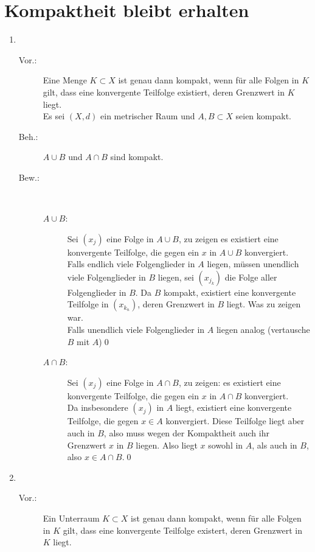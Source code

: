\documentclass[sectionformat=aufgabe]{gadsescript}
\begin{document}
\section{Kompaktheit bleibt erhalten}
\begin{enumerate}[label=(\alph*)]
	\item ~
		\begin{description}
			\item[Vor.:] Eine Menge $ K \subset X $ ist genau dann kompakt, wenn für alle Folgen in $ K $ gilt, dass eine konvergente Teilfolge existiert, deren Grenzwert in $ K $ liegt.\\
				Es sei $ (X, d) $ ein metrischer Raum und $ A, B \subset X $ seien kompakt.
			\item[Beh.:] $ A \cup B $ und $ A \cap B $ sind kompakt.
			\item[Bew.:] ~
				\begin{description}
					\item[$ A \cup B $:] Sei $ (x_j) $ eine Folge in $ A \cup B $, zu zeigen es existiert eine konvergente Teilfolge, die gegen ein $ x $ in $ A \cup B $ konvergiert.\\
						Falls endlich viele Folgenglieder in $ A $ liegen, müssen unendlich viele Folgenglieder in $ B $ liegen, sei $ (x_{j_k} ) $ die Folge aller Folgenglieder in $ B $.
						Da $ B $ kompakt, existiert eine konvergente Teilfolge in $ (x_{k_n} ) $, deren Grenzwert in $ B $ liegt. Was zu zeigen war.\\
						Falls unendlich viele Folgenglieder in $ A $ liegen analog (vertausche $ B $ mit $ A $)\qed
					\item[$ A \cap B $:] Sei $ (x_j) $ eine Folge in $ A \cap B $, zu zeigen: es existiert eine konvergente Teilfolge, die gegen ein $ x $ in $ A \cap B $ konvergiert.\\
						Da insbesondere $ (x_j) $ in $ A $ liegt, existiert eine konvergente Teilfolge, die gegen $ x \in  A $ konvergiert.
						Diese Teilfolge liegt aber auch in $ B $, also muss wegen der Kompaktheit auch ihr Grenzwert $ x $ in $ B $ liegen.
						Also liegt $ x $ sowohl in $ A $, als auch in $ B $, also $ x \in A \cap B $.\qed
				\end{description}
		\end{description}
		\newpage
	\item ~
		\begin{description}
			\item[Vor.:] Ein Unterraum $ K \subset X $ ist genau dann kompakt, wenn für alle Folgen in $ K $ gilt, dass eine konvergente Teilfolge existert, deren Grenzwert in $ K $ liegt.\\

\end{description}
\end{enumerate}
\end{document}
